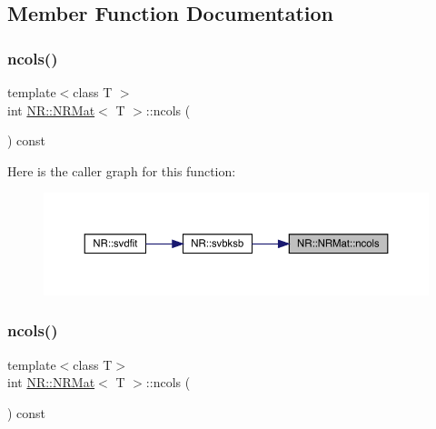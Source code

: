 \subsection{Member Function Documentation}
\mbox{\label{classNR_1_1NRMat_ad6c5ecfb47d80c934bedeb7ea395fd84}} 
\subsubsection{\texorpdfstring{ncols()}{ncols()}\hspace{0.1cm}{\footnotesize\ttfamily [1/2]}}
{\footnotesize\ttfamily template$<$class T $>$ \\
int \mbox{\hyperlink{classNR_1_1NRMat}{N\+R\+::\+N\+R\+Mat}}$<$ T $>$\+::ncols (\begin{DoxyParamCaption}{ }\end{DoxyParamCaption}) const\hspace{0.3cm}{\ttfamily [inline]}}

Here is the caller graph for this function\+:\nopagebreak
\begin{figure}[H]
\begin{center}
\leavevmode
\includegraphics[width=350pt]{da/d92/classNR_1_1NRMat_ad6c5ecfb47d80c934bedeb7ea395fd84_icgraph}
\end{center}
\end{figure}
\mbox{\label{classNR_1_1NRMat_ad6c5ecfb47d80c934bedeb7ea395fd84}} 
\subsubsection{\texorpdfstring{ncols()}{ncols()}\hspace{0.1cm}{\footnotesize\ttfamily [2/2]}}
{\footnotesize\ttfamily template$<$class T$>$ \\
int \mbox{\hyperlink{classNR_1_1NRMat}{N\+R\+::\+N\+R\+Mat}}$<$ T $>$\+::ncols (\begin{DoxyParamCaption}{ }\end{DoxyParamCaption}) const\hspace{0.3cm}{\ttfamily [inline]}}

